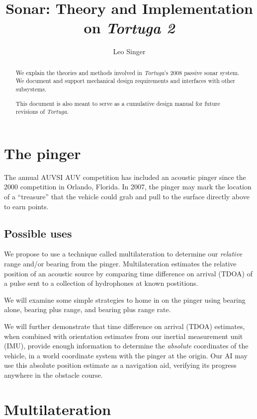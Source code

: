 \documentclass[10pt]{article}
\title{Sonar: Theory and Implementation on \textit{Tortuga 2}}
\author{Leo Singer}
\begin{document}
\maketitle

\begin{abstract}
We explain the theories and methods involved in \textit{Tortuga}'s 2008 passive sonar system.  We document and support mechanical design requirements and interfaces with other subsystems.

This document is also meant to serve as a cumulative design manual for future revisions of \textit{Tortuga}.
\end{abstract}

\tableofcontents

\clearpage

\section{The pinger}

The annual AUVSI AUV competition has included an acoustic pinger since the 2000 competition in Orlando, Florida.  In 2007, the pinger may mark the location of a ``treasure'' that the vehicle could grab and pull to the surface directly above to earn points.

\subsection{Possible uses}

We propose to use a technique called multilateration to determine our \emph{relative} range and/or bearing from the pinger.  Multilateration estimates the relative position of an acoustic source by comparing time difference on arrival (TDOA) of a pulse sent to a collection of hydrophones at known postitions.

We will examine some simple strategies to home in on the pinger using bearing alone, bearing plus range, and bearing plus range rate.

We will further demonstrate that time difference on arrival (TDOA) estimates, when combined with orientation estimates from our inertial measurement unit (IMU), provide enough information to determine the \emph{absolute} coordinates of the vehicle, in a world coordinate system with the pinger at the origin.  Our AI may use this absolute position estimate as a navigation aid, verifying its progress anywhere in the obstacle course.

\section{Multilateration}
\end{document}
